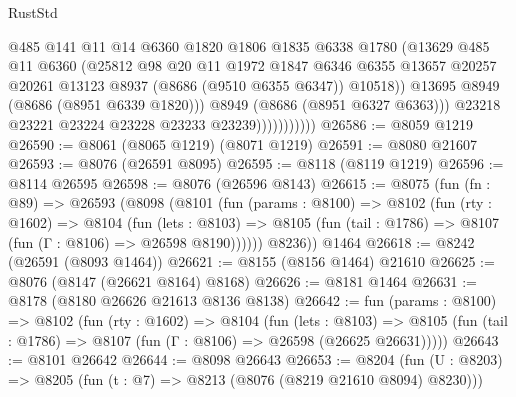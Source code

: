 \begin{lexlean}{RustStd}
\begin{coremodule}
                              @485
                              @141
                              @11
                              @14
                              @6360
                              @1820
                              @1806
                              @1835
                              @6338
                              @1780
                              (@13629
                                @485
                                @11
                                @6360
                                (@25812
                                  @98
                                  @20
                                  @11
                                  @1972
                                  @1847
                                  @6346
                                  @6355
                                  @13657
                                  @20257
                                  @20261
                                  @13123
                                  @8937
                                  (@8686 (@9510 @6355 @6347))
                                  @10518))
                              @13695
                              @8949
                              (@8686 (@8951 @6339 @1820)))
                            @8949
                            (@8686 (@8951 @6327 @6363)))
                          @23218
                          @23221
                          @23224
                          @23228
                          @23233
                          @23239)))))))))))
@26586 := @8059 @1219
@26590 := @8061 (@8065 @1219) (@8071 @1219)
@26591 := @8080 @21607
@26593 := @8076 (@26591 @8095)
@26595 := @8118 (@8119 @1219)
@26596 := @8114 @26595
@26598 := @8076 (@26596 @8143)
@26615 := @8075
    (fun (fn : @89) =>
    @26593
      (@8098
        (@8101
          (fun (params : @8100) =>
          @8102
            (fun (rty : @1602) =>
            @8104
              (fun (lets : @8103) =>
              @8105 (fun (tail : @1786) => @8107 (fun (Γ : @8106) => @26598 @8190))))))
        @8236))
    @1464
@26618 := @8242 (@26591 (@8093 @1464))
@26621 := @8155 (@8156 @1464) @21610
@26625 := @8076 (@8147 (@26621 @8164) @8168)
@26626 := @8181 @1464
@26631 := @8178 (@8180 @26626 @21613 @8136 @8138)
@26642 := fun (params : @8100) =>
  @8102
    (fun (rty : @1602) =>
    @8104
      (fun (lets : @8103) =>
      @8105 (fun (tail : @1786) => @8107 (fun (Γ : @8106) => @26598 (@26625 @26631)))))
@26643 := @8101 @26642
@26644 := @8098 @26643
@26653 := @8204
    (fun (U : @8203) => @8205 (fun (t : @7) => @8213 (@8076 (@8219 @21610 @8094) @8230)))

\end{coremodule}
\end{lexlean}
